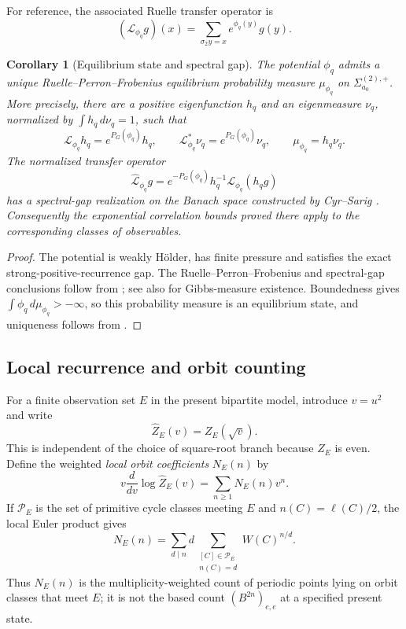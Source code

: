 \documentclass[11pt,reqno]{amsart}
\numberwithin{equation}{section}
\newtheorem{corollary}[theorem]{Corollary}
\theoremstyle{definition}
\theoremstyle{remark}
\begin{document}
For reference, the associated Ruelle transfer operator is
\begin{equation}\label{eq:ruelle-operator}
 (\mathcal L_{\phi_q}g)(x)
 =\sum_{\sigma_2 y=x}e^{\phi_q(y)}g(y).
\end{equation}

\begin{corollary}[Equilibrium state and spectral gap]
\label{cor:rpf-consequences}
The potential $\phi_q$ admits a unique Ruelle--Perron--Frobenius equilibrium
probability measure $\mu_{\phi_q}$ on $\Sigma^{(2),+}_{a_0}$.  More precisely,
there are a positive eigenfunction $h_q$ and an eigenmeasure $\nu_q$, normalized
by $\int h_q\,d\nu_q=1$, such that
\[
 \mathcal L_{\phi_q}h_q=e^{P_G(\phi_q)}h_q,
 \qquad
 \mathcal L_{\phi_q}^{*}\nu_q=e^{P_G(\phi_q)}\nu_q,
 \qquad
 \mu_{\phi_q}=h_q\nu_q.
\]
The normalized transfer operator
\begin{equation}\label{eq:normalized-ruelle-operator}
 \widehat{\mathcal L}_{\phi_q}g
 =e^{-P_G(\phi_q)}h_q^{-1}
   \mathcal L_{\phi_q}(h_qg)
\end{equation}
has a spectral-gap realization on the Banach space constructed by Cyr--Sarig
\cite{CyrSarig2009}.  Consequently the exponential correlation bounds proved
there apply to the corresponding classes of observables.
\end{corollary}

\begin{proof}
The potential is weakly H\"older, has finite pressure and satisfies the exact
strong-positive-recurrence gap.  The Ruelle--Perron--Frobenius and spectral-gap
conclusions follow from
\cite{Sarig1999,SarigPhase2001,CyrSarig2009,RuhrSarig2022}; see also
\cite{Sarig2003} for Gibbs-measure existence.  Boundedness gives
$\int\phi_q\,d\mu_{\phi_q}>-\infty$, so this probability measure is an
equilibrium state, and uniqueness follows from \cite{BuzziSarig2003}.
\end{proof}

\subsection{Local recurrence and orbit counting}

For a finite observation set $E$ in the present bipartite model, introduce
$v=u^2$ and write
\[
 \widehat Z_E(v)=Z_E(\sqrt v).
\]
This is independent of the choice of square-root branch because $Z_E$ is even.
Define the weighted \emph{local orbit coefficients} $N_E(n)$ by
\begin{equation}\label{eq:NE-definition}
 v\frac{d}{dv}\log\widehat Z_E(v)
 =\sum_{n\ge1}N_E(n)v^n.
\end{equation}
If $\mathcal P_E$ is the set of primitive cycle classes meeting $E$ and
$n(C)=\ell(C)/2$, the local Euler product gives
\begin{equation}\label{eq:NE-orbit-meaning}
 N_E(n)=\sum_{d\mid n}d
 \sum_{\substack{[C]\in\mathcal P_E\\n(C)=d}}W(C)^{n/d}.
\end{equation}
Thus $N_E(n)$ is the multiplicity-weighted count of periodic points lying on
orbit classes that meet $E$; it is not the based count $(B^{2n})_{e,e}$ at a
specified present state.
\end{document}
